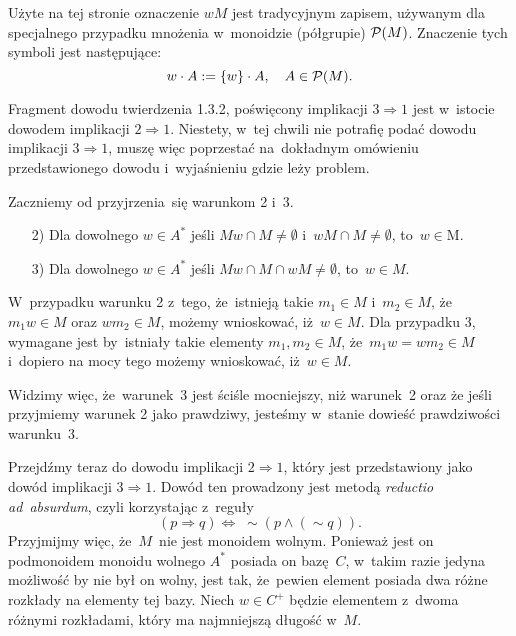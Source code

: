 \documentclass[a4paper,11pt]{article}
\begin{document}
\vspace{\spaceFour}





 Użyte na tej stronie oznaczenie $w M$ jest tradycyjnym
zapisem, używanym dla specjalnego przypadku mnożenia w~monoidzie (półgrupie)
$\mathcal{P}( M )$. Znaczenie tych symboli jest następujące:
\begin{equation}
  \label{eq:Forys-Forys-70}
  w \cdot A := \{ w \} \cdot A, \quad
  A \in \mathcal{P}( M ).
\end{equation}

\vspace{\spaceFour}





 Fragment dowodu twierdzenia 1.3.2, poświęcony implikacji
$3 \Rightarrow 1$ jest w~istocie dowodem implikacji $2 \Rightarrow 1$. Niestety, w~tej chwili
nie potrafię podać dowodu implikacji $3 \Rightarrow 1$, muszę więc poprzestać
na~dokładnym omówieniu przedstawionego dowodu i~wyjaśnieniu gdzie leży
problem.

Zaczniemy od przyjrzenia~się warunkom 2 i~3.
\begin{itemize}

\item[2)] Dla dowolnego $w \in A^{ * }$ jeśli $M w \cap M \neq \emptyset$
  i~$w M \cap M \neq \emptyset$, to~$w \in $M.

\item[3)] Dla dowolnego $w \in A^{ * }$ jeśli $M w \cap M \cap w M \neq \emptyset$,
  to~$w \in M$.

\end{itemize}
W~przypadku warunku 2 z~tego, że~istnieją takie $m_{ 1 } \in M$
i~$m_{ 2 } \in M$, że~$m_{ 1 } w \in M$ oraz $w m_{ 2 } \in M$, możemy wnioskować,
iż~$w \in M$. Dla przypadku 3, wymagane jest by~istniały takie elementy
$m_{ 1 }, m_{ 2 } \in M$, że~$m_{ 1 } w = w m_{ 2 } \in M$ i~dopiero na mocy tego
możemy wnioskować, iż~$w \in M$.

Widzimy więc, że~warunek~3 jest ściśle mocniejszy, niż warunek~2 oraz że
jeśli przyjmiemy warunek 2 jako prawdziwy, jesteśmy w~stanie dowieść
prawdziwości warunku~3.

Przejdźmy teraz do dowodu implikacji $2 \Rightarrow 1$, który jest przedstawiony
jako dowód implikacji $3 \Rightarrow 1$. Dowód ten prowadzony jest metodą
\textit{reductio ad~absurdum}, czyli korzystając z~reguły
\begin{equation}
  \label{eq:Forys-Forys-71}
  ( p \Rightarrow q ) \Leftrightarrow \; \sim ( p \wedge ( \sim q ) ).
\end{equation}
Przyjmijmy więc, że~$M$~nie jest monoidem wolnym. Ponieważ jest on
podmonoidem monoidu wolnego $A^{ * }$ posiada on bazę~$C$, w~takim razie
jedyna możliwość by nie był on wolny, jest tak, że~pewien element posiada
dwa różne rozkłady na elementy tej bazy. Niech $w \in C^{ + }$ będzie
elementem z~dwoma różnymi rozkładami, który ma najmniejszą długość w~$M$.
\end{document}
